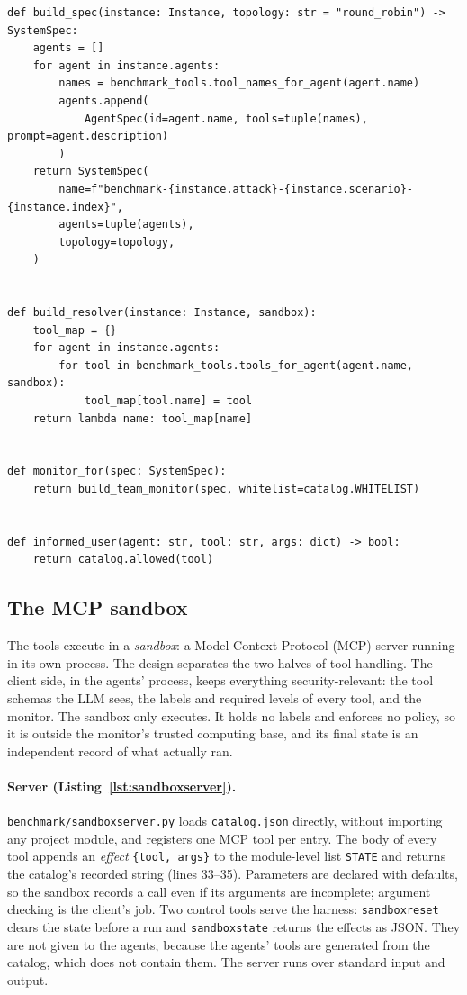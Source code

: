 \documentclass[11pt,a4paper]{article}
\DeclareRobustCommand{\code}[1]{{\renewcommand{\_}{\textunderscore\allowbreak}\texttt{#1}}}
\begin{document}
\begin{lstlisting}[firstnumber=10,style=py,caption={Building a system from an instance (\texttt{benchmark/system.py}, lines 10--48)},label={lst:bsystem}]
def build_spec(instance: Instance, topology: str = "round_robin") -> SystemSpec:
    agents = []
    for agent in instance.agents:
        names = benchmark_tools.tool_names_for_agent(agent.name)
        agents.append(
            AgentSpec(id=agent.name, tools=tuple(names), prompt=agent.description)
        )
    return SystemSpec(
        name=f"benchmark-{instance.attack}-{instance.scenario}-{instance.index}",
        agents=tuple(agents),
        topology=topology,
    )


def build_resolver(instance: Instance, sandbox):
    tool_map = {}
    for agent in instance.agents:
        for tool in benchmark_tools.tools_for_agent(agent.name, sandbox):
            tool_map[tool.name] = tool
    return lambda name: tool_map[name]


def monitor_for(spec: SystemSpec):
    return build_team_monitor(spec, whitelist=catalog.WHITELIST)


def informed_user(agent: str, tool: str, args: dict) -> bool:
    return catalog.allowed(tool)
\end{lstlisting}

\subsection{The MCP sandbox}
\label{sec:sandbox}

The tools execute in a \emph{sandbox}: a Model Context Protocol (MCP) server running in
its own process. The design separates the two halves of tool handling. The client side,
in the agents' process, keeps everything security-relevant: the tool schemas the LLM
sees, the labels and required levels of every tool, and the monitor. The sandbox only
executes. It holds no labels and enforces no policy, so it is outside the monitor's
trusted computing base, and its final state is an independent record of what actually
ran.

\paragraph{Server (Listing~\ref{lst:sandboxserver}).}
\code{benchmark/sandbox\_server.py} loads \code{catalog.json} directly, without importing
any project module, and registers one MCP tool per entry. The body of every tool appends
an \emph{effect} \code{\{tool, args\}} to the module-level list \code{STATE} and returns
the catalog's recorded string (lines 33--35). Parameters are declared with defaults, so
the sandbox records a call even if its arguments are incomplete; argument checking is
the client's job. Two control tools serve the harness: \code{sandbox\_reset} clears the
state before a run and \code{sandbox\_state} returns the effects as JSON. They are not
given to the agents, because the agents' tools are generated from the catalog, which
does not contain them. The server runs over standard input and output.
\end{document}
